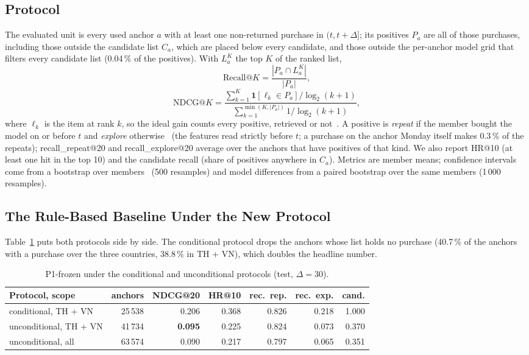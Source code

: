 \documentclass{ieeeaccess}
\newcommand{\nNoPosShare}{40.7}      %
\begin{document}
\subsection{Protocol}
The evaluated unit is every used anchor $a$ with at least one non-returned purchase in $(t, t+\Delta]$; its positives $P_a$ are all of
those purchases, including those outside the candidate list $C_a$, which are placed below every candidate, and those outside the
per-anchor model grid that filters every candidate list (0.04\,\% of the positives). With $L_a^K$ the top $K$ of
the ranked list,
\begin{equation}
\mathrm{Recall}@K = \frac{|P_a \cap L_a^K|}{|P_a|},
\end{equation}
\begin{equation}
\mathrm{NDCG}@K = \frac{\sum_{k=1}^{K} \mathbf{1}[\ell_k \in P_a] / \log_2(k+1)}{\sum_{k=1}^{\min(K, |P_a|)} 1/\log_2(k+1)},
\end{equation}
where $\ell_k$ is the item at rank $k$, so the ideal gain counts every positive, retrieved or not~\cite{jarvelin2002ndcg}. A positive is \emph{repeat} if the member bought
the model on or before $t$ and \emph{explore} otherwise~\cite{li2023nbr} (the features read strictly before $t$; a purchase on the
anchor Monday itself makes 0.3\,\% of the repeats); recall\_repeat@20 and recall\_explore@20 average over the anchors
that have positives of that kind. We also report HR@10 (at least one hit in the top 10) and the candidate recall (share of positives
anywhere in $C_a$). Metrics are member means; confidence intervals come from a bootstrap over members~\cite{efron1993bootstrap}
(500 resamples) and model differences from a paired bootstrap over the same members (1\,000 resamples).

\subsection{The Rule-Based Baseline Under the New Protocol}
Table~\ref{tab:t28} puts both protocols side by side. The conditional protocol drops the anchors whose list holds no purchase
(\nNoPosShare{}\,\% of the anchors with a purchase over the three countries, 38.8\,\% in TH + VN), which doubles the headline number.

\begin{table}[t]
\caption{P1-frozen under the conditional and unconditional protocols (test, $\Delta = 30$).}
\label{tab:t28}
\setlength{\tabcolsep}{3pt}
\centering
\begin{adjustbox}{max width=\columnwidth}
\begin{tabular}{lrrrrrr}
\toprule
Protocol, scope & anchors & NDCG@20 & HR@10 & rec.\ rep. & rec.\ exp. & cand. \\
\midrule
conditional, TH + VN   & 25\,538 & 0.206 & 0.368 & 0.826 & 0.218 & 1.000 \\
unconditional, TH + VN & 41\,734 & \textbf{0.095} & 0.225 & 0.824 & 0.073 & 0.370 \\
unconditional, all     & 63\,574 & 0.090 & 0.217 & 0.797 & 0.065 & 0.351 \\
\bottomrule
\end{tabular}
\end{adjustbox}
\end{table}
\end{document}
